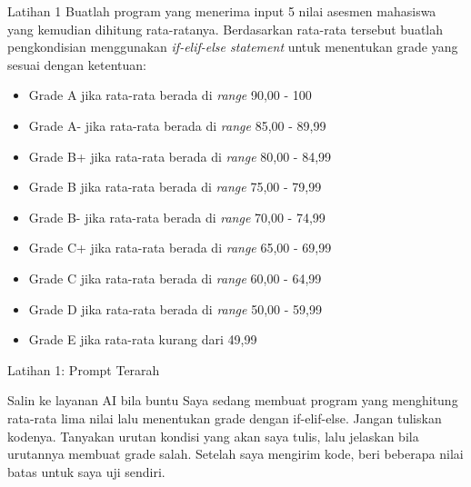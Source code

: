\documentclass[aspectratio=169, table]{beamer}
\begin{document}
\begin{frame}[fragile,allowframebreaks=0.8]{Latihan 1}
\footnotesize
Buatlah program yang menerima input 5 nilai asesmen mahasiswa yang kemudian dihitung rata-ratanya. Berdasarkan rata-rata tersebut buatlah pengkondisian menggunakan \textit{if-elif-else statement} untuk menentukan grade yang sesuai dengan ketentuan:
\begin{itemize}
    \item Grade A jika rata-rata berada di \textit{range} 90,00 - 100
    \item Grade A- jika rata-rata berada di \textit{range} 85,00 - 89,99
    \item Grade B+ jika rata-rata berada di \textit{range} 80,00 - 84,99
    \item Grade B jika rata-rata berada di \textit{range} 75,00 - 79,99
    \item Grade B- jika rata-rata berada di \textit{range} 70,00 - 74,99
    \item Grade C+ jika rata-rata berada di \textit{range} 65,00 - 69,99
    \item Grade C jika rata-rata berada di \textit{range} 60,00 - 64,99
    \item Grade D jika rata-rata berada di \textit{range} 50,00 - 59,99
    \item Grade E jika rata-rata kurang dari 49,99
\end{itemize}
\end{frame}

\begin{frame}{Latihan 1: Prompt Terarah}
\begin{block}{Salin ke layanan AI bila buntu}
\small Saya sedang membuat program yang menghitung rata-rata lima nilai lalu menentukan grade dengan if-elif-else. Jangan tuliskan kodenya. Tanyakan urutan kondisi yang akan saya tulis, lalu jelaskan bila urutannya membuat grade salah. Setelah saya mengirim kode, beri beberapa nilai batas untuk saya uji sendiri.
\end{block}
\end{frame}
\end{document}

